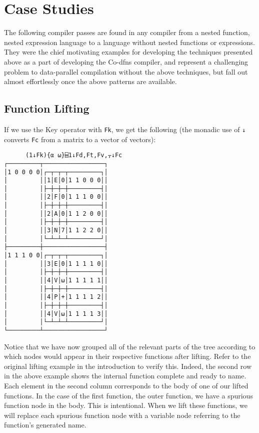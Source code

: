 \documentclass[numbers,preprint]{sigplanconf}
\begin{document}
\section{Case Studies}

The following compiler passes are found in any compiler from a nested function, 
nested expression language to a language without nested functions 
or expressions. They were the chief motivating examples for developing the 
techniques presented above as a part of developing the Co-dfns compiler, 
and represent a challenging problem to data-parallel compilation without 
the above techniques, but fall out almost effortlessly once the above patterns 
are available. 

\subsection{Function Lifting}

If we use the Key operator with \verb;Fk;, we get the following (the monadic
use of \verb;↓; converts \verb;Fc; from a matrix to a vector of vectors):

\begin{verbatim}
      (1↓Fk){⍺ ⍵}⌸1↓Fd,Ft,Fv,⍪↓Fc
┌─────────┬─────────────────┐
│1 0 0 0 0│┌─┬─┬─┬─────────┐│
│         ││1│E│0│1 1 0 0 0││
│         │├─┼─┼─┼─────────┤│
│         ││2│F│0│1 1 1 0 0││
│         │├─┼─┼─┼─────────┤│
│         ││2│A│0│1 1 2 0 0││
│         │├─┼─┼─┼─────────┤│
│         ││3│N│7│1 1 2 2 0││
│         │└─┴─┴─┴─────────┘│
├─────────┼─────────────────┤
│1 1 1 0 0│┌─┬─┬─┬─────────┐│
│         ││3│E│0│1 1 1 1 0││
│         │├─┼─┼─┼─────────┤│
│         ││4│V│⍵│1 1 1 1 1││
│         │├─┼─┼─┼─────────┤│
│         ││4│P│+│1 1 1 1 2││
│         │├─┼─┼─┼─────────┤│
│         ││4│V│⍵│1 1 1 1 3││
│         │└─┴─┴─┴─────────┘│
└─────────┴─────────────────┘
\end{verbatim}

Notice that we have now grouped all of the relevant parts of the
tree according to which nodes would appear in their respective
functions after lifting. Refer to the original lifting example in
the introduction to verify this. Indeed, the second row in the
above example shows the internal function complete and ready to
name. Each element in the second column corresponds to the body of
one of our lifted functions. In the case of the first function, the
outer function, we have a spurious function node in the body. This
is intentional. When we lift these functions, we will replace
each spurious function node with a variable node referring to the
function’s generated name.
\end{document}

